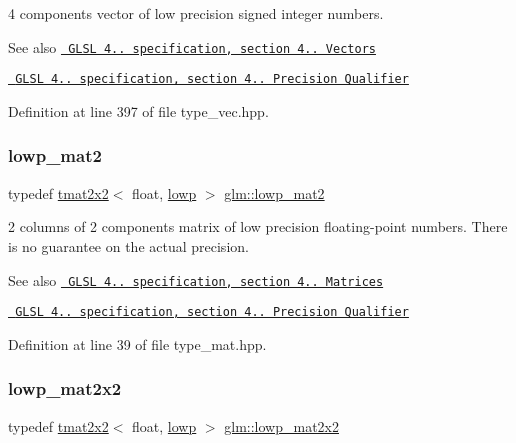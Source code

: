 4 components vector of low precision signed integer numbers.

\begin{DoxySeeAlso}{See also}
\href{http://www.opengl.org/registry/doc/GLSLangSpec.4.20.8.pdf}{\texttt{ G\+L\+SL 4.. specification, section 4.. Vectors}} 

\href{http://www.opengl.org/registry/doc/GLSLangSpec.4.20.8.pdf}{\texttt{ G\+L\+SL 4.. specification, section 4.. Precision Qualifier}} 
\end{DoxySeeAlso}


Definition at line 397 of file type\+\_\+vec.\+hpp.

\mbox{\label{group__core__precision_ga2eb6d28afe554e1a2ebc79e3201e8651}} 
\subsubsection{\texorpdfstring{lowp\_mat2}{lowp\_mat2}}
{\footnotesize\ttfamily typedef \mbox{\hyperlink{structglm_1_1tmat2x2}{tmat2x2}}$<$ float, \mbox{\hyperlink{namespaceglm_a0f04f086094c747d227af4425893f545ae161af3fc695e696ce3bf69f7332bc2d}{lowp}} $>$ \mbox{\hyperlink{group__core__precision_ga2eb6d28afe554e1a2ebc79e3201e8651}{glm\+::lowp\+\_\+mat2}}}

2 columns of 2 components matrix of low precision floating-\/point numbers. There is no guarantee on the actual precision.

\begin{DoxySeeAlso}{See also}
\href{http://www.opengl.org/registry/doc/GLSLangSpec.4.20.8.pdf}{\texttt{ G\+L\+SL 4.. specification, section 4.. Matrices}} 

\href{http://www.opengl.org/registry/doc/GLSLangSpec.4.20.8.pdf}{\texttt{ G\+L\+SL 4.. specification, section 4.. Precision Qualifier}} 
\end{DoxySeeAlso}


Definition at line 39 of file type\+\_\+mat.\+hpp.

\mbox{\label{group__core__precision_ga764ca10ac431c7306adaf9e134795919}} 
\subsubsection{\texorpdfstring{lowp\_mat2x2}{lowp\_mat2x2}}
{\footnotesize\ttfamily typedef \mbox{\hyperlink{structglm_1_1tmat2x2}{tmat2x2}}$<$ float, \mbox{\hyperlink{namespaceglm_a0f04f086094c747d227af4425893f545ae161af3fc695e696ce3bf69f7332bc2d}{lowp}} $>$ \mbox{\hyperlink{group__core__precision_ga764ca10ac431c7306adaf9e134795919}{glm\+::lowp\+\_\+mat2x2}}}

